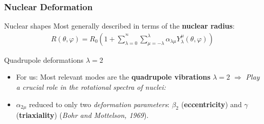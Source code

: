 \documentclass{beamer}
\begin{document}
\begin{frame}
	\frametitle{Nuclear Deformation}
	\begin{exampleblock}{Nuclear shapes}
		Most generally described in terms of the \textbf{nuclear radius}:
		\begin{align}
			R(\theta,\varphi)=R_0\left(1+\sum_{\lambda=0}^{^\infty}\sum_{\mu=-\lambda}^\lambda\alpha_{\lambda\mu}Y_\lambda^\mu(\theta,\varphi)\right)\nonumber
		\end{align}
	\end{exampleblock}
	\begin{block}{Quadrupole deformations $\lambda=2$}

		\begin{itemize}
			\item {\color{red}For us:} Most relevant modes are the \textbf{quadrupole vibrations} $\lambda=2$ $\Longrightarrow$ \emph{Play a crucial role in the rotational spectra of nuclei:}
			\item $\alpha_{2\mu}$ reduced to only two \emph{deformation parameters}: $\beta_2$ (\textbf{eccentricity}) and $\gamma$ (\textbf{triaxiality}) (\textit{Bohr and Mottelson, 1969}).
		\end{itemize}
	\end{block}
\end{frame}
\end{document}
